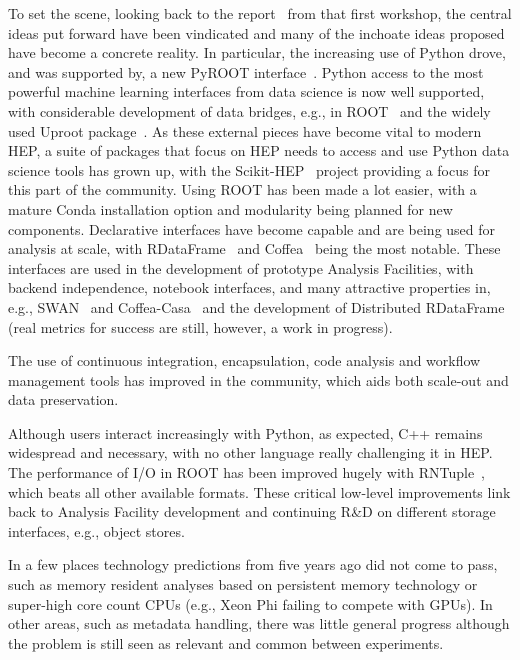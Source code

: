 \documentclass[a4paper,11pt]{article}
\begin{document}
To set the scene, looking back to the report~\cite{elmer_peter_2017_6599290} 
from that first
workshop, the central ideas put forward have been vindicated and many of
the inchoate ideas proposed have become a concrete reality. In
particular, the increasing use of Python drove, and was supported by, a
new PyROOT interface~\cite{Galli:2020boj}. Python access to the most powerful machine
learning interfaces from data science is now well supported, with
considerable development of data bridges, e.g., in ROOT~\cite{An:2021} and the widely used
Uproot package~\cite{Pivarski_Uproot_2017}. As these
external pieces have become vital to modern HEP, a suite of packages
that focus on HEP needs to access and use Python data science tools has
grown up, with the Scikit-HEP~\cite{scikit-hep,Rodrigues:2020syo}
project providing a focus for this part of the community. Using ROOT has
been made a lot easier, with a mature Conda installation option and
modularity being planned for new components. Declarative interfaces have
become capable and are being used for analysis at scale, with RDataFrame~\cite{rdataframe}
and Coffea~\cite{Smith:2020pxs,lindsey_gray_2022_7158492} being
the most notable. These interfaces are used in the development of
prototype Analysis Facilities, with backend independence, notebook
interfaces, and many attractive properties in, e.g.,
SWAN~\cite{swan, PIPARO20181071} and Coffea-Casa~\cite{refId0-coffea-casa} and the
development of Distributed RDataFrame~\cite{distrdf} (real metrics for success are
still, however, a work in progress).

The use of continuous integration, encapsulation, code analysis and
workflow management tools has improved in the community, which aids both
scale-out and data preservation.

Although users interact increasingly with Python, as expected, C++
remains wide\-spread and necessary, with no other language really
challenging it in HEP. The performance of I/O in ROOT
\cite{BRUN199781,rene_brun_2019_3895860} has been improved
hugely with RNTuple~\cite{ntuple20}, which beats all other available formats. These
critical low-level improvements link back to Analysis Facility
development and continuing R\&D on different storage interfaces, e.g.,
object stores.

In a few places technology predictions from five years ago did not come
to pass, such as memory resident analyses based on persistent memory
technology or super-high core count CPUs (e.g., Xeon Phi failing to
compete with GPUs). In other areas, such as metadata handling, there was
little general progress although the problem is still seen as relevant
and common between experiments.
\end{document}
